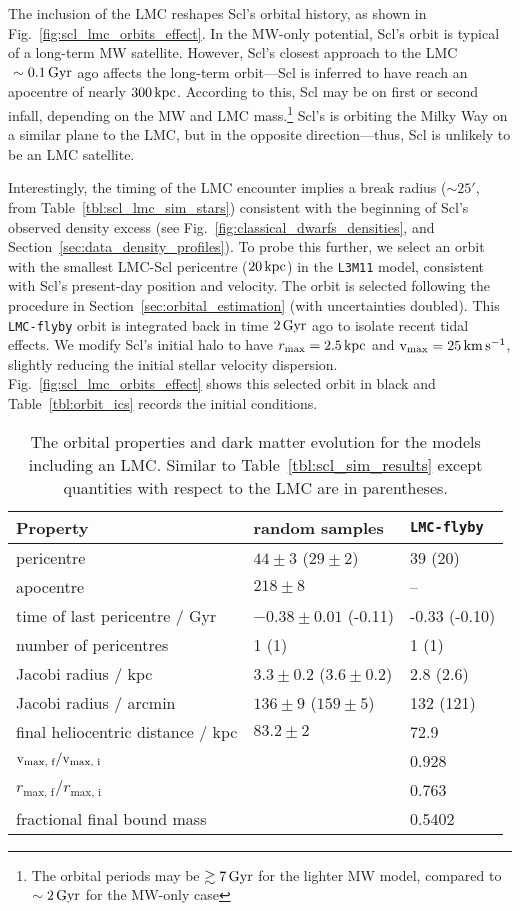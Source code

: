 The inclusion of the LMC reshapes Scl's orbital history, as shown in
Fig.~\ref{fig:scl_lmc_orbits_effect}. In the MW-only potential, Scl's
orbit is typical of a long-term MW satellite. However, Scl's closest
approach to the LMC \(~\sim0.1\,{\rm Gyr}\) ago affects the long-term
orbit---Scl is inferred to have reach an apocentre of nearly
\(300\,{\rm kpc}\). According to this, Scl may be on first or second infall,
depending on the MW and LMC mass.\footnote{The orbital periods may be
  \(\gtrsim 7\,{\rm Gyr}\) for the lighter MW model, compared to
  \(\sim 2\,{\rm Gyr}\) for the MW-only case} Scl's is orbiting the Milky Way
on a similar plane to the LMC, but in the opposite direction---thus, Scl
is unlikely to be an LMC satellite.

Interestingly, the timing of the LMC encounter implies a break radius
(\(\sim 25'\), from Table~\ref{tbl:scl_lmc_sim_stars}) consistent with
the beginning of Scl's observed density excess (see
Fig.~\ref{fig:classical_dwarfs_densities}, and
Section~\ref{sec:data_density_profiles}). To probe this further, we
select an orbit with the smallest LMC-Scl pericentre (\(20\,{\rm kpc}\)) in
the \texttt{L3M11} model, consistent with Scl's present-day position and
velocity. The orbit is selected following the procedure in
Section~\ref{sec:orbital_estimation} (with uncertainties doubled). This
\texttt{LMC-flyby} orbit is integrated back in time \(2\,{\rm Gyr}\) ago to
isolate recent tidal effects. We modify Scl's initial halo to have
\(r_{\rm max} = 2.5\,{\rm kpc}\) and \({\rm v}_{\rm max} = 25\,{\rm km\,s^{-1}}\), slightly reducing the
initial stellar velocity dispersion.
Fig.~\ref{fig:scl_lmc_orbits_effect} shows this selected orbit in black
and Table~\ref{tbl:orbit_ics} records the initial conditions.

\begin{table*}[t]
\centering
\caption[Orbits and results for Sculptor in the MW+LMC potential.]{The orbital properties and dark matter evolution for the models including an LMC. Similar to Table \ref{tbl:scl_sim_results} except quantities with respect to the LMC are in parentheses. }
\label{tbl:scl_lmc_sims}
\begin{tabular}{lll}
\toprule
Property & random samples & \texttt{LMC-flyby}\\
\midrule
pericentre & $44\pm 3$ ($29 \pm 2$) & 39 (20)\\
apocentre & $218 \pm 8$ & –\\
time of last pericentre / Gyr & $-0.38\pm0.01$ (-0.11) & -0.33 (-0.10)\\
number of pericentres & 1 (1) & 1 (1)\\
Jacobi radius / kpc & $3.3\pm0.2$ ($3.6\pm0.2$) & 2.8 (2.6)\\
Jacobi radius / arcmin & $136 \pm 9$ ($159\pm5$) & 132 (121)\\
final heliocentric distance / kpc & $83.2\pm2$ & 72.9\\
${\rm v}_\textrm{max, f} / {\rm v}_\textrm{max, i}$ &  & 0.928\\
$r_\textrm{max, f} / r_\textrm{max, i}$ &  & 0.763\\
fractional final bound mass &  & 0.5402\\
\bottomrule
\end{tabular}
\end{table*}

